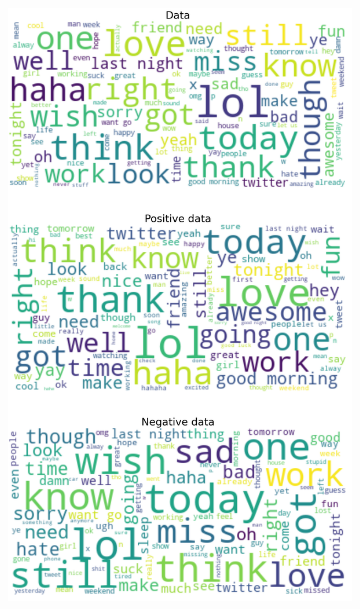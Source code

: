 \documentclass{article}
\begin{document}
\begin{itemize}
\begin{figure}[H]
\begin{subfigure}[b]{0.24\textwidth}
\includegraphics[width=\textwidth]{chapter-06/section-01-01/08/visualization/3/wordcloud.png}
\end{subfigure}
\begin{subfigure}[b]{0.24\textwidth}
\centering

\end{subfigure}
\end{figure}
\end{itemize}
\end{document}
